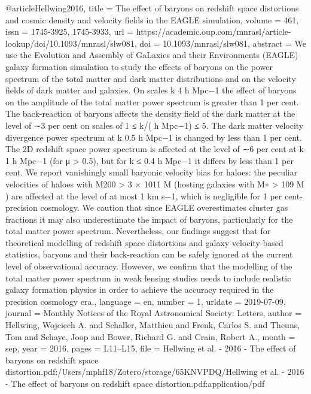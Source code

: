 {@article{Hellwing2016,
	title = {The effect of baryons on redshift space distortions and cosmic density and velocity fields in the {EAGLE} simulation},
	volume = {461},
	issn = {1745-3925, 1745-3933},
	url = {https://academic.oup.com/mnrasl/article-lookup/doi/10.1093/mnrasl/slw081},
	doi = {10.1093/mnrasl/slw081},
	abstract = {We use the Evolution and Assembly of GaLaxies and their Environments (EAGLE) galaxy formation simulation to study the effects of baryons on the power spectrum of the total matter and dark matter distributions and on the velocity ﬁelds of dark matter and galaxies. On scales k 4 h Mpc−1 the effect of baryons on the amplitude of the total matter power spectrum is greater than 1 per cent. The back-reaction of baryons affects the density ﬁeld of the dark matter at the level of ∼3 per cent on scales of 1 ≤ k/( h Mpc−1) ≤ 5. The dark matter velocity divergence power spectrum at k 0.5 h Mpc−1 is changed by less than 1 per cent. The 2D redshift space power spectrum is affected at the level of ∼6 per cent at {\textbar}k{\textbar} 1 h Mpc−1 (for μ {\textgreater} 0.5), but for {\textbar}k{\textbar} ≤ 0.4 h Mpc−1 it differs by less than 1 per cent. We report vanishingly small baryonic velocity bias for haloes: the peculiar velocities of haloes with M200 {\textgreater} 3 × 1011 M (hosting galaxies with M∗ {\textgreater} 109 M ) are affected at the level of at most 1 km s−1, which is negligible for 1 per cent-precision cosmology. We caution that since EAGLE overestimates cluster gas fractions it may also underestimate the impact of baryons, particularly for the total matter power spectrum. Nevertheless, our ﬁndings suggest that for theoretical modelling of redshift space distortions and galaxy velocity-based statistics, baryons and their back-reaction can be safely ignored at the current level of observational accuracy. However, we conﬁrm that the modelling of the total matter power spectrum in weak lensing studies needs to include realistic galaxy formation physics in order to achieve the accuracy required in the precision cosmology era.},
	language = {en},
	number = {1},
	urldate = {2019-07-09},
	journal = {Monthly Notices of the Royal Astronomical Society: Letters},
	author = {Hellwing, Wojciech A. and Schaller, Matthieu and Frenk, Carlos S. and Theuns, Tom and Schaye, Joop and Bower, Richard G. and Crain, Robert A.},
	month = sep,
	year = {2016},
	pages = {L11--L15},
	file = {Hellwing et al. - 2016 - The effect of baryons on redshift space distortion.pdf:/Users/mphf18/Zotero/storage/65KNVPDQ/Hellwing et al. - 2016 - The effect of baryons on redshift space distortion.pdf:application/pdf}
}


}
